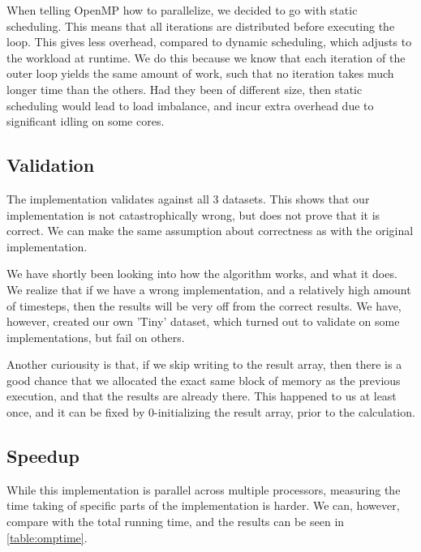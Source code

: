 \documentclass[11pt]{article}
\begin{document}
When telling OpenMP how to parallelize, we decided to go with static scheduling.
This means that all iterations are distributed before executing the loop. This gives
less overhead, compared to dynamic scheduling, which adjusts to the workload at runtime. We do
this because we know that each iteration of the outer loop yields the same
amount of work, such that no iteration takes much longer time than the others.
Had they been of different size, then static scheduling would lead to load 
imbalance, and incur extra overhead due to significant idling on some cores.


\subsection{Validation}
The implementation validates against all 3 datasets. This shows that our
implementation is not catastrophically wrong, but does not prove that it is
correct. We can make the same assumption about correctness as with the 
original implementation.

We have shortly been looking into how the algorithm works, and what it does. We
realize that if we have a wrong implementation, and a relatively high amount of 
timesteps, then the results will be very off from the correct results. We have,
however, created our own 'Tiny' dataset, which turned out to validate on some
implementations, but fail on others.

Another curiousity is that, if we skip writing to the result array, then there
is a good chance that we allocated the exact same block of memory as the 
previous execution, and that the results are already there. This happened to us
at least once, and it can be fixed by 0-initializing the result array, prior to
the calculation.


\subsection{Speedup}
While this implementation is parallel across multiple processors, measuring the
time taking of specific parts of the implementation is harder. We can, however, 
compare with the total running time, and the results can be seen in 
\autoref{table:omptime}.

\begin{table}[h]
\centering
{}
\caption{Speedup comparison of the original implementation and the OpenMP implementation}
\label{table:omptime}
\end{table}
\end{document}
